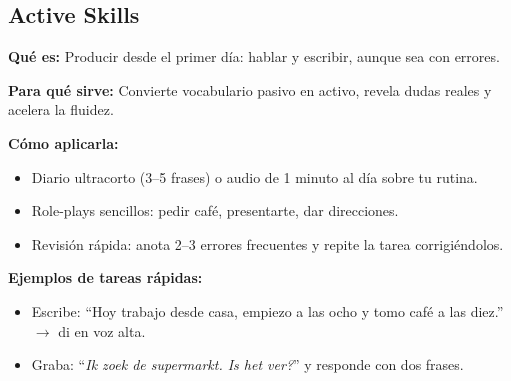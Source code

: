 \subsection*{Active Skills}
\textbf{Qué es:} Producir desde el primer día: hablar y escribir, aunque sea con errores.

\textbf{Para qué sirve:} Convierte vocabulario pasivo en activo, revela dudas reales y acelera la fluidez.

\textbf{Cómo aplicarla:}
\begin{itemize}[leftmargin=*]
	\item Diario ultracorto (3--5 frases) o audio de 1 minuto al día sobre tu rutina.
	\item Role-plays sencillos: pedir café, presentarte, dar direcciones.
	\item Revisión rápida: anota 2--3 errores frecuentes y repite la tarea corrigiéndolos.
\end{itemize}

\textbf{Ejemplos de tareas rápidas:}
\begin{itemize}[leftmargin=*]
	\item Escribe: \enquote{Hoy trabajo desde casa, empiezo a las ocho y tomo café a las diez.} $\rightarrow$ di en voz alta.
	\item Graba: \enquote{\textit{Ik zoek de supermarkt. Is het ver?}} y responde con dos frases.
\end{itemize}
